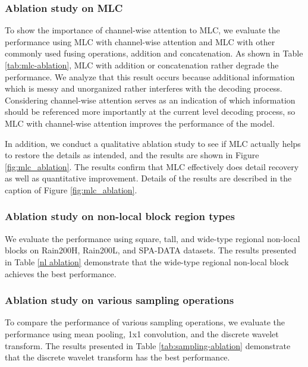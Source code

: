 \documentclass[a4paper,fleqn]{cas-dc}
\begin{document}
\subsubsection{Ablation study on MLC}
\label{sec:mlc_ablation}
To show the importance of channel-wise attention to MLC, we evaluate the performance using MLC with channel-wise attention and MLC with other commonly used fusing operations, addition and concatenation.
As shown in Table \ref{tab:mlc-ablation}, MLC with addition or concatenation rather degrade the performance. We analyze that this result occurs because additional information which is messy and unorganized rather interferes with the decoding process. Considering channel-wise attention serves as an indication of which information should be referenced more importantly at the current level decoding process, so MLC with channel-wise attention improves the performance of the model. 


In addition, we conduct a qualitative ablation study to see if MLC actually helps to restore the details as intended, and the results are shown in Figure \ref{fig:mlc_ablation}. The results confirm that MLC effectively does detail recovery as well as quantitative improvement. Details of the results are described in the caption of Figure \ref{fig:mlc_ablation}.

\subsubsection{Ablation study on non-local block region types} 
We evaluate the performance using square, tall, and wide-type regional non-local blocks on Rain200H, Rain200L, and SPA-DATA datasets. The results presented in Table \ref{nl ablation} demonstrate that the wide-type regional non-local block achieves the best performance.

\subsubsection{Ablation study on various sampling operations} 
To compare the performance of various sampling operations, we evaluate the performance using mean pooling, 1x1 convolution, and the discrete wavelet transform. The results presented in Table \ref{tab:sampling-ablation} demonstrate that the discrete wavelet transform has the best performance.
\end{document}
